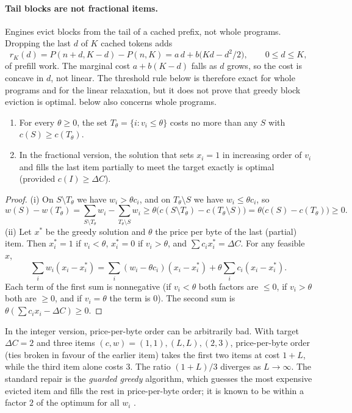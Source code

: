 \paragraph{Tail blocks are not fractional items.} Engines evict blocks from the tail
of a cached prefix, not whole programs. Dropping the last $d$ of $K$ cached tokens adds
\[
  r_K(d)=P(n+d,K-d)-P(n,K)=a\,d+b\bigl(Kd-d^2/2\bigr),\qquad 0\le d\le K,
\]
of prefill work. The marginal cost $a+b(K-d)$ falls as $d$ grows, so the cost is
concave in $d$, not linear. The threshold rule below is therefore exact for whole
programs and for the linear relaxation, but it does not prove that greedy block
eviction is optimal.  below also concerns whole programs.

\begin{theorem}\label{thm:threshold}
\begin{enumerate}[label=(\roman*)]
\item For every $\theta\ge0$, the set $T_\theta=\{i:v_i\le\theta\}$ costs no more
  than any $S$ with $c(S)\ge c(T_\theta)$.
\item In the fractional version, the solution that sets $x_i=1$ in increasing
  order of $v_i$ and fills the last item partially to meet the target exactly is
  optimal (provided $c(I)\ge\Delta C$).
\end{enumerate}
\end{theorem}

\begin{proof}
(i) On $S\setminus T_\theta$ we have $w_i>\theta c_i$, and on $T_\theta\setminus S$
we have $w_i\le\theta c_i$, so
\[
  w(S)-w(T_\theta)=\sum_{S\setminus T_\theta}w_i-\sum_{T_\theta\setminus S}w_i
  \ge\theta\bigl(c(S\setminus T_\theta)-c(T_\theta\setminus S)\bigr)=\theta\bigl(c(S)-c(T_\theta)\bigr)\ge0 .
\]
(ii) Let $x^*$ be the greedy solution and $\theta$ the price per byte of the last
(partial) item. Then $x^*_i=1$ if $v_i<\theta$, $x^*_i=0$ if $v_i>\theta$, and
$\sum c_ix^*_i=\Delta C$. For any feasible $x$,
\[
  \sum_iw_i(x_i-x^*_i)=\sum_i(w_i-\theta c_i)(x_i-x^*_i)+\theta\sum_ic_i(x_i-x^*_i) .
\]
Each term of the first sum is nonnegative (if $v_i<\theta$ both factors are
$\le0$, if $v_i>\theta$ both are $\ge0$, and if $v_i=\theta$ the term is $0$). The
second sum is $\theta(\sum c_ix_i-\Delta C)\ge0$.
\end{proof}

In the integer version, price-per-byte order can be arbitrarily bad. With target
$\Delta C=2$ and three items $(c,w)=(1,1),(L,L),(2,3)$, price-per-byte order (ties
broken in favour of the earlier item) takes the first two items at cost $1+L$,
while the third item alone costs $3$. The ratio $(1+L)/3$ diverges as
$L\to\infty$. The standard repair is the \emph{guarded greedy} algorithm, which
guesses the most expensive evicted item and fills the rest in price-per-byte
order; it is known to be within a factor $2$ of the optimum for all $w_i$
\cite{csirik1991}.

